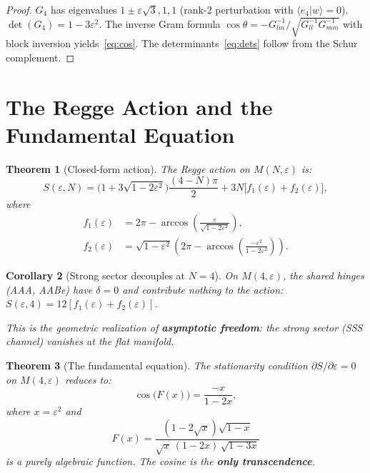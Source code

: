 \documentclass[12pt]{article}
\newtheorem{theorem}{Theorem}[section]
\newtheorem{corollary}[theorem]{Corollary}
\theoremstyle{definition}
\theoremstyle{remark}
\begin{document}
\begin{proof}
$G_4$ has eigenvalues $1 \pm \varepsilon\sqrt{3}, 1, 1$
(rank-2 perturbation with $\langle e_4|w\rangle = 0$).
$\det(G_4) = 1-3\varepsilon^2$.
The inverse Gram formula $\cos\theta = -G^{-1}_{lm}/\sqrt{G^{-1}_{ll}G^{-1}_{mm}}$
with block inversion yields~\eqref{eq:cos}. The determinants~\eqref{eq:dets}
follow from the Schur complement.
\end{proof}

\section{The Regge Action and the Fundamental Equation}
\label{sec:action}

\begin{theorem}[Closed-form action]
\label{thm:action}
The Regge action on $M(N,\varepsilon)$ is:
\begin{equation}
S(\varepsilon,N) = \bigl(1+3\sqrt{1-2\varepsilon^2}\bigr)\frac{(4-N)\pi}{2}
  + 3N\bigl[f_1(\varepsilon)+f_2(\varepsilon)\bigr],
\label{eq:action}
\end{equation}
where
\begin{align}
f_1(\varepsilon) &= 2\pi - \arccos\!\left(\frac{\varepsilon}{\sqrt{1-2\varepsilon^2}}\right), \\
f_2(\varepsilon) &= \sqrt{1-\varepsilon^2}\left(2\pi - \arccos\!\left(\frac{-\varepsilon^2}{1-2\varepsilon^2}\right)\right).
\end{align}
\end{theorem}

\begin{corollary}[Strong sector decouples at $N=4$]
\label{cor:decouple}
On $M(4,\varepsilon)$, the shared hinges (AAA, AABe) have $\delta=0$
and contribute nothing to the action:
$S(\varepsilon,4) = 12[f_1(\varepsilon)+f_2(\varepsilon)]$.

This is the geometric realization of \textbf{asymptotic freedom}:
the strong sector (SSS channel) vanishes at the flat manifold.
\end{corollary}

\begin{theorem}[The fundamental equation]
\label{thm:fundamental}
The stationarity condition $\partial S/\partial\varepsilon = 0$
on $M(4,\varepsilon)$ reduces to:
\begin{equation}
\boxed{\cos\!\bigl(F(x)\bigr) = \frac{-x}{1-2x}},
\label{eq:fundamental}
\end{equation}
where $x = \varepsilon^2$ and
\begin{equation}
F(x) = \frac{(1-2\sqrt{x})\sqrt{1-x}}{\sqrt{x}\,(1-2x)\,\sqrt{1-3x}}
\label{eq:Fx}
\end{equation}
is a purely algebraic function. The cosine is the \textbf{only transcendence}.
\end{theorem}
\end{document}
